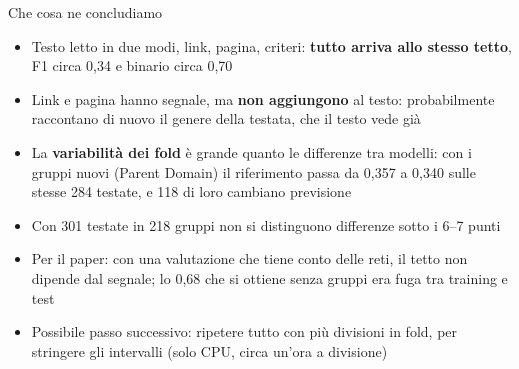 \documentclass[aspectratio=169]{beamer}
\newcommand{\hl}[1]{\textbf{#1}}
\begin{document}
\begin{frame}{Che cosa ne concludiamo}
  \begin{itemize}
    \setlength\itemsep{0.6em}
    \small
    \item Testo letto in due modi, link, pagina, criteri: \hl{tutto arriva allo stesso tetto}, F1 circa 0,34 e binario circa 0,70
    \item Link e pagina hanno segnale, ma \hl{non aggiungono} al testo: probabilmente raccontano di nuovo il genere della testata, che il testo vede gi\`a
    \item La \hl{variabilit\`a dei fold} \`e grande quanto le differenze tra modelli: con i gruppi nuovi (Parent Domain) il riferimento passa da 0,357 a 0,340 sulle stesse 284 testate, e 118 di loro cambiano previsione
    \item Con 301 testate in 218 gruppi non si distinguono differenze sotto i 6--7 punti
    \item Per il paper: con una valutazione che tiene conto delle reti, il tetto non dipende dal segnale; lo 0,68 che si ottiene senza gruppi era fuga tra training e test
    \item Possibile passo successivo: ripetere tutto con pi\`u divisioni in fold, per stringere gli intervalli (solo CPU, circa un'ora a divisione)
  \end{itemize}
\end{frame}
\end{document}
